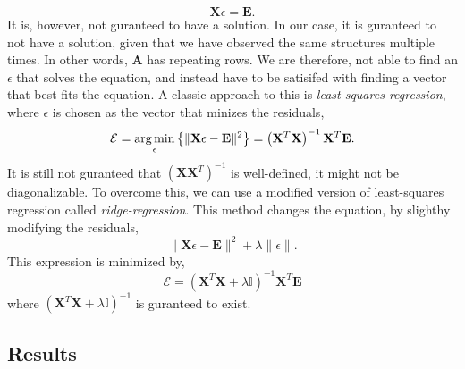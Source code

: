 \documentclass[working, oneside]{../../../Preambles/marginclass}
\begin{document}
\[
\bm{X}\epsilon = \bm{E}
.\] 
It is, however, not guranteed to have a solution. In our case, it is guranteed to not have a solution, given that we have observed the same structures multiple times. In other words, $\bm{A}$ has repeating rows. We are therefore, not able to find an $\epsilon$ that solves the equation, and instead have to be satisifed with finding a vector that best fits the equation. A classic approach to this is \textit{least-squares regression}, where $\epsilon$ is chosen as the vector that minizes the residuals,
\[
   \mathcal{E} = \operatorname*{arg\,min}_{\epsilon} \left\{ \|\mathbf{X}\epsilon - \mathbf{E}\|^2 \right\}  = \left( \mathbf{X}^{T}\mathbf{X} \right) ^{-1} \mathbf{X}^{T}\mathbf{E}
.\]
It is still not guranteed that $\left( \bm{X}\bm{X}^{T} \right) ^{-1}$ is well-defined, it might not be diagonalizable. To overcome this, we can use a modified version of least-squares regression called \textit{ridge-regression}. This method changes the equation, by slighthy modifying the residuals,
\[
\|\bm{X}\epsilon - \bm{E}\|^2 + \lambda\|\epsilon\|
.\] 
This expression is minimized by,
\[
    \mathcal{E} = \left( \bm{X}^{T}\bm{X} + \lambda \mathbb{I} \right) ^{-1}\bm{X}^{T}\bm{E}
\]
where $ \left( \bm{X}^{T}\bm{X} + \lambda \mathbb{I} \right) ^{-1}$ is guranteed to exist.
\newpage
{}
\subsection{Results}
\marginmath[0pt]{
\[
    \mathcal{E} =
\begin{bmatrix}
    \epsilon_1 \\
    \epsilon_2 \\
    \epsilon_3 \\
    \epsilon_4 \\
    \epsilon_5 \\
    \epsilon_6 \\
    \epsilon_7 \\
\end{bmatrix}
= 
\begin{bmatrix}
    1.33 \\
    1.15 \\
    0.86 \\
    0.63 \\
    0.49 \\
    0.56 \\
    0.72 \\
\end{bmatrix}
\text{eV}
.\] 
}
\end{document}
